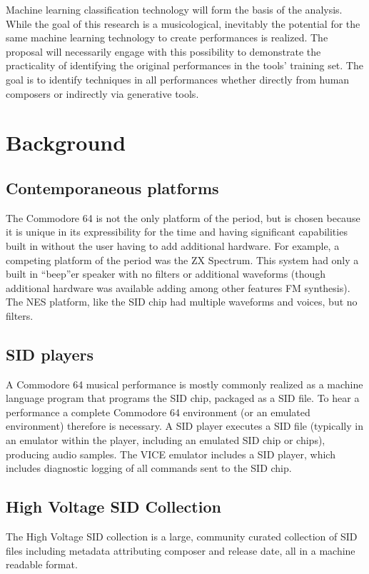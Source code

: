 \documentclass[10pt]{article}
\begin{document}
\begin{multicols*}{2}
  Machine learning classification technology will form the basis of
  the analysis. While the goal of this research is a musicological,
  inevitably the potential for the same machine learning technology to
  create performances is realized. The proposal will necessarily
  engage with this possibility to demonstrate the practicality of
  identifying the original performances in the tools' training
  set. The goal is to identify techniques in all performances whether
  directly from human composers or indirectly via generative tools.

  \section{Background}

  \subsection{Contemporaneous platforms}
  The Commodore 64 is not the only platform of the period, but is
  chosen because it is unique in its expressibility for the time and
  having significant capabilities built in without the user having to
  add additional hardware. For example, a competing platform of the
  period was the ZX Spectrum. This system had only a built in
  ``beep''er speaker with no filters or additional waveforms (though
  additional hardware was available adding among other features
  FM synthesis). The NES platform, like the SID chip had multiple
  waveforms and voices, but no filters.

  \subsection{SID players}
  A Commodore 64 musical performance is mostly commonly realized as a
  machine language program that programs the SID chip, packaged as a
  SID file. To hear a performance a complete Commodore 64 environment
  (or an emulated environment) therefore is necessary. A SID player
  executes a SID file (typically in an emulator within the player,
  including an emulated SID chip or chips), producing audio samples.
  The VICE emulator includes a SID player, which includes diagnostic
  logging of all commands sent to the SID chip.

  \subsection{High Voltage SID Collection}
  The High Voltage SID collection is a large, community curated
  collection of SID files including metadata attributing composer
  and release date, all in a machine readable format.


\end{multicols*}
\end{document}
